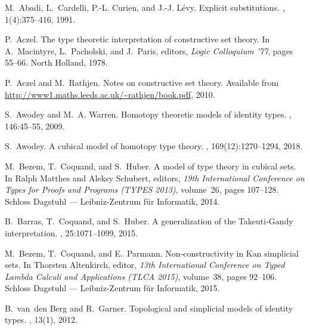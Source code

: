 \documentclass[reqno,10pt,a4paper,oneside,draft]{amsart}
\numberwithin{equation}{section}
\theoremstyle{mythm}
\theoremstyle{mydef}
\theoremstyle{myrmk}
\begin{document}
\newcommand{\noopsort}[1]{}
\begin{thebibliography}{{\noopsort{Berg A}}dBM15}

M.~Abadi, L.~Cardelli, P.-L. Curien, and J.-J. L\'evy.
\newblock Explicit substitutions.
, 1(4):375--416, 1991.

P.~Aczel.
\newblock The type theoretic interpretation of constructive set theory.
\newblock In A.~Macintyre, L.~Pacholski, and J.~Paris, editors, {\em Logic
  Colloquium '77}, pages 55--66. North Holland, 1978.

P.~Aczel and M.~Rathjen.
\newblock Notes on constructive set theory.
\newblock Available from \url{http://www1.maths.leeds.ac.uk/~rathjen/book.pdf},
  2010.

S.~Awodey and M.~A. Warren.
\newblock Homotopy theoretic models of identity types.
, 146:45--55, 2009.

S.~Awodey.
\newblock A cubical model of homotopy type theory.
, 169(12):1270--1294, 2018.

M.~Bezem, T.~Coquand, and S.~Huber.
\newblock A model of type theory in cubical sets.
\newblock In Ralph Matthes and Aleksy Schubert, editors, {\em 19th
  International Conference on Types for Proofs and Programs (TYPES 2013)},
  volume~26, pages 107--128. Schloss Dagstuhl --- Leibniz-Zentrum f{\"u}r
  Informatik, 2014.

B.~Barras, T.~Coquand, and S.~Huber.
\newblock A generalization of the {T}akeuti-{G}andy interpretation.
, 25:1071--1099,
  2015.

M.~Bezem, T.~Coquand, and E.~Parmann.
\newblock Non-constructivity in {K}an simplicial sets.
\newblock In Thorsten Altenkirch, editor, {\em 13th International Conference on
  Typed Lambda Calculi and Applications (TLCA 2015)}, volume~38, pages 92--106.
  Schloss Dagstuhl --- Leibniz-Zentrum f{\"u}r Informatik, 2015.

\bibitem[{\noopsort{Berg A}}dBG12]{BergB:topsmi}
B.~{\noopsort{Berg A}}van~den Berg and R.~Garner.
\newblock Topological and simplicial models of identity types.
, 13(1), 2012.


\end{thebibliography}
\end{document}
